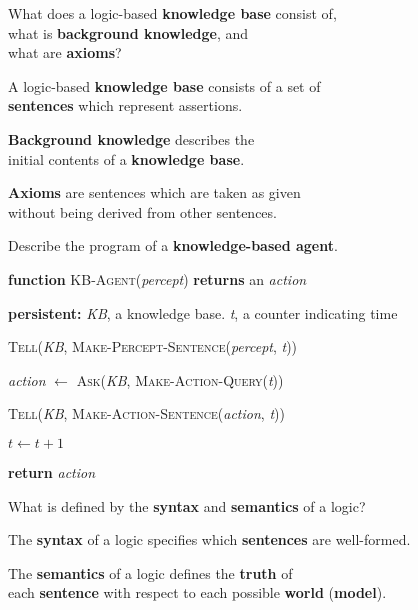 
\begin{flashcard}[Question]{What does a logic-based \textbf{knowledge base} consist of,\\what is \textbf{background knowledge}, and\\what are \textbf{axioms}?}
\begin{center}
A logic-based \textbf{knowledge base} consists of a set of\\\textbf{sentences} which represent assertions.

\medskip

\textbf{Background knowledge} describes the\\initial contents of a \textbf{knowledge base}.

\medskip

\textbf{Axioms} are sentences which are taken as given\\without being derived from other sentences.
\end{center}
\end{flashcard}

\begin{flashcard}[Question]{Describe the program of a \textbf{knowledge-based agent}.}
\begin{center}
\begin{minipage}{0.9\textwidth}
\textbf{function} \textsc{KB-Agent}(\textit{percept}) \textbf{returns} an \textit{action}

\quad \textbf{persistent:} \textit{KB}, a knowledge base. \textit{t}, a counter indicating time

\quad \textsc{Tell}(\textit{KB}, \textsc{Make-Percept-Sentence}(\textit{percept}, \textit{t}))

\quad \textit{action} $\leftarrow$ \textsc{Ask}(\textit{KB}, \textsc{Make-Action-Query}(\textit{t}))

\quad \textsc{Tell}(\textit{KB}, \textsc{Make-Action-Sentence}(\textit{action}, \textit{t}))

\quad $t \leftarrow t + 1$

\quad \textbf{return} \textit{action}

\end{minipage}
\end{center}
\end{flashcard}

\begin{flashcard}[Question]{What is defined by the \textbf{syntax} and \textbf{semantics} of a logic?}
\begin{center}
The \textbf{syntax} of a logic specifies which \textbf{sentences} are well-formed.

\medskip

The \textbf{semantics} of a logic defines the \textbf{truth} of\\each \textbf{sentence} with respect to each possible \textbf{world} (\textbf{model}).
\end{center}
\end{flashcard}

